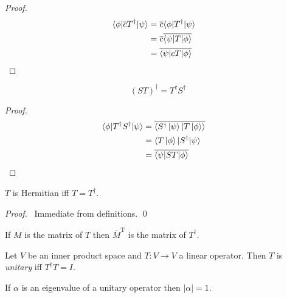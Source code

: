 \begin{proof}
\pf
\begin{align*}
\langle \phi | \overline{c} T^\dagger | \psi \rangle
& = \overline{c} \langle \phi | T^\dagger | \psi \rangle \\
& = \overline{c} \overline{\langle \psi | T | \phi \rangle} \\
& = \overline{\langle \psi | cT | \phi \rangle} & \qed
\end{align*}
\end{proof}

\begin{prop}
\[ (ST)^\dagger = T^\dagger S^\dagger \]
\end{prop}

\begin{proof}
\pf
\begin{align*}
\langle \phi | T^\dagger S^\dagger | \psi \rangle
& = \overline{\langle S^\dagger \ket{\psi} | T \ket{\phi} \rangle} \\
& = \langle T \ket{\phi} | S^\dagger | \psi \rangle \\
& = \overline{\langle \psi | S T | \phi \rangle} & \qed
\end{align*}
\end{proof}

\begin{prop}
$T$ is Hermitian iff $T = T^\dagger$.
\end{prop}

\begin{proof}
\pf\ Immediate from definitions. \qed
\end{proof}

\begin{prop}
If $M$ is the matrix of $T$ then $\overline{M}^\mathrm{T}$ is the matrix of $T^\dagger$.
\end{prop}

\begin{df}[Unitary]
Let $V$ be an inner product space and $T : V \rightarrow V$ a linear operator. Then $T$ is \emph{unitary} iff $T^\dagger T = I$.
\end{df}

\begin{prop}
If $\alpha$ is an eigenvalue of a unitary operator then $|\alpha| = 1$.
\end{prop}

